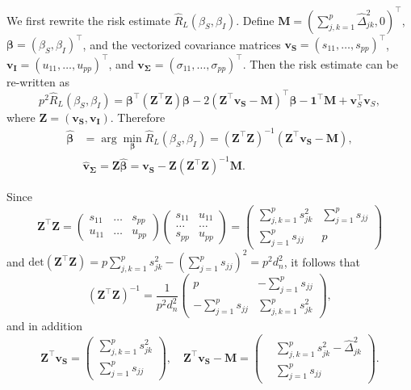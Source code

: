 \documentclass{article}
\def\bs{\mathbf}
\begin{document}
  We first rewrite the risk estimate $\hat{R}_L(\beta_S, \beta_I)$. Define $\bs{M}=(\sum_{j,k=1}^p\hat{\Delta}_{jk}^2, 0)^\top$, $\bs{\beta} = (\beta_S, \beta_I)^\top$, and the vectorized covariance matrices $\bs{v_S}=(s_{11},\ldots, s_{pp})^\top $, $\bs{v_I}=(u_{11},\ldots, u_{pp})^\top $, and $\bs{v_{\Sigma}} = (\sigma_{11},\ldots,\sigma_{pp})^\top$. Then the risk estimate can be re-written as
  \[
 p^2 \hat{R}_L(\beta_S,\beta_I) = \bs{\beta}^\top (\bs{Z}^\top \bs{Z})\bs{\beta} - 2(\bs{Z}^\top\bs{v_S}-\bs{M})^\top \bs{\beta} - \bs{1}^\top \bs{M}+\bs{v}_S^\top\bs{v}_S,
  \]
  where $\bs{Z} =(\bs{v_S}, \bs{v_I})$. Therefore
  \begin{align*}
    \hat{\bs{\beta}} &= \arg\min_{ \bs{\beta} }\hat{R}_L(\beta_S,\beta_I) = (\bs{Z}^\top \bs{Z})^{-1}(\bs{Z}^\top\bs{v_S}-\bs{M}),\\
    &
    \hat{\bs{v}}_{\bs{\Sigma}} = \bs{Z\hat{\beta}} = \bs{v_S} - \bs{Z}(\bs{Z}^\top \bs{Z})^{-1}\bs{M}.
  \end{align*}

  Since
$$\bs{Z}^\top \bs{Z} = \begin{pmatrix}
s_{11} &\ldots &s_{pp} \\
u_{11} &\ldots &u_{pp} 
\end{pmatrix}\begin{pmatrix}
s_{11}  &u_{11} \\
\ldots&\ldots\\
s_{pp} &u_{pp} 
\end{pmatrix}=\begin{pmatrix}
\sum_{j,k=1}^ps_{jk}^2 & \sum_{j=1}^ps_{jj}\\
\sum_{j=1}^ps_{jj} & p
\end{pmatrix}$$
and
$\text{det}( \bs{Z}^\top \bs{Z} ) = p\sum_{j,k=1}^ps_{jk}^2 - (\sum_{j=1}^p s_{jj})^2 = p^2d_n^2$, it follows that
$$(\bs{Z}^\top \bs{Z})^{-1} = \frac{1}{p^2d_n^2}\begin{pmatrix}
p & -\sum_{j=1}^p s_{jj}\\
-\sum_{j=1}^p s_{jj} & \sum_{j,k=1}^ps_{jk}^2
\end{pmatrix},$$
and in addition
$$\bs{Z}^\top \bs{v_S}= \begin{pmatrix}
\sum_{j,k=1}^ps_{jk}^2\\
\sum_{j=1}^p s_{jj}
\end{pmatrix},
\quad 
\bs{Z^\top \bs{v_S}}-\bs{M} =  \begin{pmatrix}
&\sum_{j,k=1}^ps_{jk}^2 - \hat{\Delta}_{jk}^2\\
&\sum_{j=1}^p s_{jj}
\end{pmatrix}.$$
\end{document}
